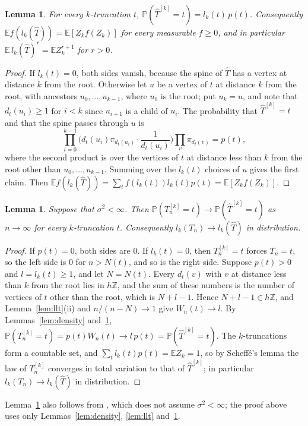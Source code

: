 \documentclass[11pt]{amsart}
\newtheorem{lemma}[theorem]{Lemma}
\theoremstyle{remark}
\numberwithin{equation}{section}
\newcommand{\Pp}{\mathbb P}
\newcommand{\E}{\mathbb E}
\newcommand{\Z}{\mathbb Z}
\newcommand{\hT}{\widehat T}
\begin{document}
\begin{lemma}\label{lem:sizebias}
For every $k$-truncation $t$, $\Pp(\hT^{[k]}=t)=l_k(t)\,p(t)$. Consequently $\E f(l_k(\hT))=\E[Z_kf(Z_k)]$ for every measurable $f\ge0$, and in particular $\E\, l_k(\hT)^r=\E Z_k^{r+1}$ for $r>0$.
\end{lemma}

\begin{proof}
If $l_k(t)=0$, both sides vanish, because the spine of $\hT$ has a vertex at distance $k$ from the root. Otherwise let $u$ be a vertex of $t$ at distance $k$ from the root, with ancestors $u_0,\dots,u_{k-1}$, where $u_0$ is the root; put $u_k=u$, and note that $d_t(u_i)\ge1$ for $i<k$ since $u_{i+1}$ is a child of $u_i$. The probability that $\hT^{[k]}=t$ and that the spine passes through $u$ is
\[
\prod_{i=0}^{k-1}\Big(d_t(u_i)\pi_{d_t(u_i)}\cdot\frac1{d_t(u_i)}\Big)\prod_{v}\pi_{d_t(v)}=p(t),
\]
where the second product is over the vertices of $t$ at distance less than $k$ from the root other than $u_0,\dots,u_{k-1}$. Summing over the $l_k(t)$ choices of $u$ gives the first claim. Then $\E f(l_k(\hT))=\sum_tf(l_k(t))l_k(t)p(t)=\E[Z_kf(Z_k)]$.
\end{proof}

\begin{lemma}\label{lem:local}
Suppose that $\sigma^2<\infty$. Then $\Pp(T_n^{[k]}=t)\to\Pp(\hT^{[k]}=t)$ as $n\to\infty$ for every $k$-truncation $t$. Consequently $l_k(T_n)\to l_k(\hT)$ in distribution.
\end{lemma}

\begin{proof}
If $p(t)=0$, both sides are $0$. If $l_k(t)=0$, then $T_n^{[k]}=t$ forces $T_n=t$, so the left side is $0$ for $n>N(t)$, and so is the right side. Suppose $p(t)>0$ and $l=l_k(t)\ge1$, and let $N=N(t)$. Every $d_t(v)$ with $v$ at distance less than $k$ from the root lies in $h\Z$, and the sum of these numbers is the number of vertices of $t$ other than the root, which is $N+l-1$. Hence $N+l-1\in h\Z$, and Lemma~\ref{lem:llt}(ii) and $n/(n-N)\to1$ give $W_n(t)\to l$. By Lemmas~\ref{lem:density} and~\ref{lem:sizebias}, $\Pp(T_n^{[k]}=t)=p(t)W_n(t)\to l\,p(t)=\Pp(\hT^{[k]}=t)$. The $k$-truncations form a countable set, and $\sum_tl_k(t)p(t)=\E Z_k=1$, so by Scheff\'e's lemma the law of $T_n^{[k]}$ converges in total variation to that of $\hT^{[k]}$; in particular $l_k(T_n)\to l_k(\hT)$ in distribution.
\end{proof}

Lemma~\ref{lem:local} also follows from \cite[Theorem~7.1]{J12}, which does not assume $\sigma^2<\infty$; the proof above uses only Lemmas~\ref{lem:density}, \ref{lem:llt} and~\ref{lem:sizebias}.
\end{document}
